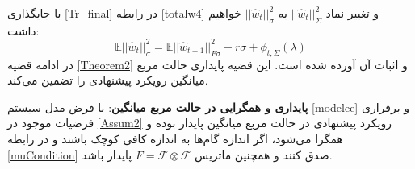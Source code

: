 با جایگذاری \ref{Tr_final} در رابطه \ref{totalw4} و تغییر نماد $||\hat{w}_t||^2_{\Sigma}$ به $||\hat{w}_t||^2_{\sigma}$  خواهیم داشت:
\begin{equation}\label{totalw5}
	\mathbb{E}||\hat{w}_t||^2_{\sigma}=\mathbb{E}||\hat{w}_{t-1}||^2_{F\sigma}+ r \sigma +\phi_{t,\Sigma}(\lambda)
\end{equation}
در ادامه قضیه \ref{Theorem2} و اثبات آن آورده شده است. این قضیه پایداری حالت مربع میانگین رویکرد پیشنهادی را تضمین می‌کند.
\begin{theorem}\label{Theorem2}
	\textbf{پایداری و همگرایی در حالت مربع میانگین}: با فرض مدل سیستم  \ref{modelee} و برقراری فرضیات موجود در  \ref{Assum2} رویکرد پیشنهادی در حالت مربع میانگین پایدار بوده و همگرا می‌شود، اگر اندازه گام‌ها به اندازه کافی کوچک باشند و در رابطه \ref{muCondition} صدق کنند و همچنین ماتریس $F=\mathcal{F}\otimes\mathcal{F}$ پایدار باشد.
	
\end{theorem}

